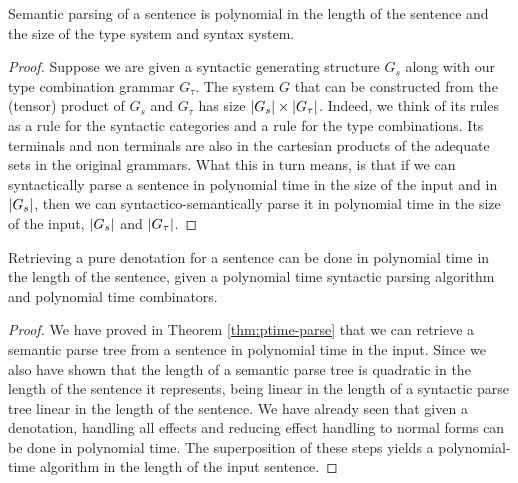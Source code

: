 \begin{theorem}
	\label{thm:ptime-parse}
	Semantic parsing of a sentence is polynomial in the length of the	sentence
	and the size of the type system and syntax system.
\end{theorem}
\begin{proof}
	Suppose we are given a syntactic generating structure $G_{s}$ along with our
	type combination grammar $G_{\tau}$.
	The system $G$ that can be constructed from the (tensor) product of $G_{s}$ and
	$G_{\tau}$ has size $\left|G_{s}\right|\times \left|G_{\tau}\right|$.
	Indeed, we think of its rules as a rule for the syntactic categories and a rule
	for the type combinations. Its terminals and non terminals are also in the
	cartesian products of the adequate sets in the original grammars.
	What this in turn means, is that if we can syntactically parse a sentence in
	polynomial time in the size of the input and in $\left|G_{s}\right|$, then we can
	syntactico-semantically parse it in polynomial time in the size of the input,
	$\left|G_{s}\right|$ and $\left|G_{\tau}\right|$.
\end{proof}

\begin{theorem}
	\label{thm:ptime-denot}
	Retrieving a pure denotation for a sentence can be done in polynomial time in
	the length of the sentence, given a polynomial time syntactic parsing
	algorithm and polynomial time combinators.
\end{theorem}

\begin{proof}
	We have proved in Theorem \ref{thm:ptime-parse} that we can retrieve a
	semantic parse tree from a	sentence in polynomial time in the input.
	Since we also have shown that the length of a semantic parse tree is quadratic
	in the length of the sentence it represents, being linear in the length of a
	syntactic parse tree linear in the length of the sentence.
	We have already seen that given a denotation, handling all effects and
	reducing effect handling to normal forms can be done in polynomial time.
	The superposition of these steps yields a polynomial-time algorithm in the
	length of the input sentence.
\end{proof}

